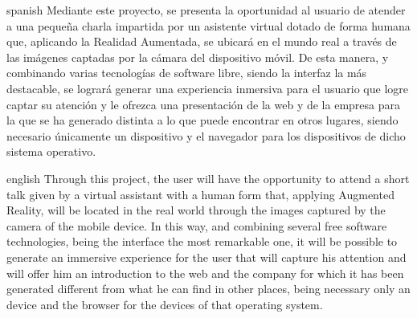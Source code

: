 \documentclass{subfiles}
\begin{document}
    \begin{abstractpage}
        \begin{abstract-lang}{spanish}
            Mediante este proyecto, se presenta la oportunidad al usuario de atender a una pequeña charla impartida por un asistente virtual dotado de forma humana que, aplicando la Realidad Aumentada, se ubicará en el mundo real a través de las imágenes captadas por la cámara del dispositivo móvil. De esta manera, y combinando varias tecnologías de software libre, siendo la interfaz \webxr la más destacable, se logrará generar una experiencia inmersiva para el usuario que logre captar su atención y le ofrezca una presentación de la web y de la empresa para la que se ha generado distinta a lo que puede encontrar en otros lugares, siendo necesario únicamente un dispositivo \android y el navegador \googlechrome para los dispositivos de dicho sistema operativo.
        \end{abstract-lang}
    \end{abstractpage}

    \begin{abstractpage}
        \begin{abstract-lang}{english}
            Through this project, the user will have the opportunity to attend a short talk given by a virtual assistant with a human form that, applying Augmented Reality, will be located in the real world through the images captured by the camera of the mobile device. In this way, and combining several free software technologies, being the \webxr interface the most remarkable one, it will be possible to generate an immersive experience for the user that will capture his attention and will offer him an introduction to the web and the company for which it has been generated different from what he can find in other places, being necessary only an \android device and the \googlechrome browser for the devices of that operating system.
        \end{abstract-lang}
    \end{abstractpage}
\end{document}
